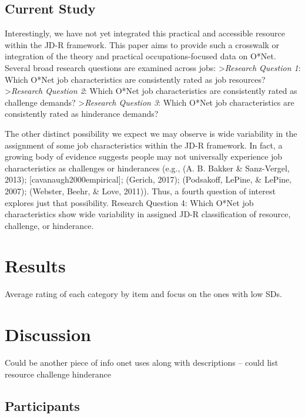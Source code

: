 \documentclass[
  english,
  man]{apa6}
\begin{document}
\hypertarget{current-study}{%
\subsection{Current Study}\label{current-study}}

Interestingly, we have not yet integrated this practical and accessible resource within the JD-R framework. This paper aims to provide such a crosswalk or integration of the theory and practical occupations-focused data on O*Net. Several broad research questions are examined across jobs:
\textgreater{}\emph{Research Question 1}: Which O*Net job characteristics are consistently rated as job resources?
\textgreater{}\emph{Research Question 2}: Which O*Net job characteristics are consistently rated as challenge demands?
\textgreater{}\emph{Research Question 3}: Which O*Net job characteristics are consistently rated as hinderance demands?

The other distinct possibility we expect we may observe is wide variability in the assignment of some job characteristics within the JD-R framework. In fact, a growing body of evidence suggests people may not universally experience job characteristics as challenges or hinderances (e.g., (A. B. Bakker \& Sanz-Vergel, 2013); {[}cavanaugh2000empirical{]}; (Gerich, 2017); (Podsakoff, LePine, \& LePine, 2007); (Webster, Beehr, \& Love, 2011)). Thus, a fourth question of interest explores just that possibility.
Research Question 4: Which O*Net job characteristics show wide variability in assigned JD-R classification of resource, challenge, or hinderance.

\hypertarget{results}{%
\section{Results}\label{results}}

Average rating of each category by item and focus on the ones with low SDs.

\hypertarget{discussion}{%
\section{Discussion}\label{discussion}}

Could be another piece of info onet uses along with descriptions -- could list resource challenge hinderance

\hypertarget{participants}{%
\subsection{Participants}\label{participants}}
\end{document}
